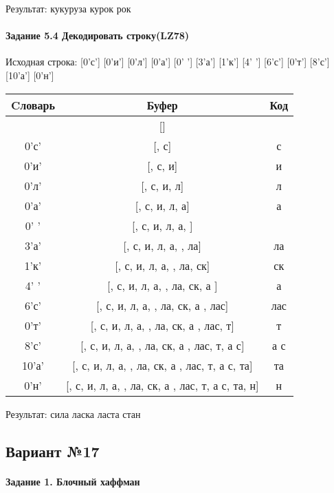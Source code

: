 \documentclass[a4paper, 12pt]{article}
\begin{document}
Результат: кукуруза курок рок
\pagebreak
\paragraph{Задание 5.4 Декодировать строку(LZ78)\\}

Исходная строка: [0'с'] [0'и'] [0'л'] [0'а'] [0' '] [3'а'] [1'к'] [4' '] [6'с'] [0'т'] [8'с'] [10'а'] [0'н']\\
\begin{table}[h!]
\centering
\begin{tabular}{|c|c|c|}
\hline
 Cловарь & Буфер & Код  \\ \hline
 & [] & 
\\ \hline
0'с' & [, с] & с
\\ \hline
0'и' & [, с, и] & и
\\ \hline
0'л' & [, с, и, л] & л
\\ \hline
0'а' & [, с, и, л, а] & а
\\ \hline
0' ' & [, с, и, л, а,  ] &  
\\ \hline
3'а' & [, с, и, л, а,  , ла] & ла
\\ \hline
1'к' & [, с, и, л, а,  , ла, ск] & ск
\\ \hline
4' ' & [, с, и, л, а,  , ла, ск, а ] & а 
\\ \hline
6'с' & [, с, и, л, а,  , ла, ск, а , лас] & лас
\\ \hline
0'т' & [, с, и, л, а,  , ла, ск, а , лас, т] & т
\\ \hline
8'с' & [, с, и, л, а,  , ла, ск, а , лас, т, а с] & а с
\\ \hline
10'а' & [, с, и, л, а,  , ла, ск, а , лас, т, а с, та] & та
\\ \hline
0'н' & [, с, и, л, а,  , ла, ск, а , лас, т, а с, та, н] & н
\\ \hline
\end{tabular}
\end{table}

Результат: сила ласка ласта стан
\pagebreak
\subsection{Вариант №17}
\paragraph{Задание 1. Блочный хаффман \\}
\end{document}
